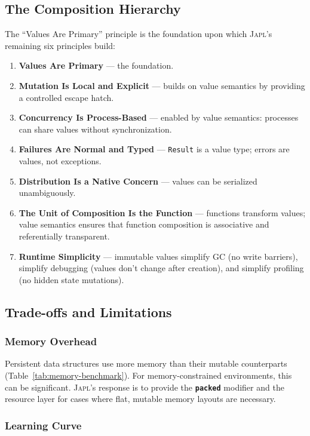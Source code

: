 \documentclass[11pt]{article}
\theoremstyle{definition}
\theoremstyle{remark}
\newcommand{\japl}{\textsc{Japl}}
\newcommand{\keyword}[1]{\texttt{\textbf{#1}}}
\begin{document}
\subsection{The Composition Hierarchy}

The ``Values Are Primary'' principle is the foundation upon which
\japl{}'s remaining six principles build:

\begin{enumerate}
  \item \textbf{Values Are Primary} --- the foundation.
  \item \textbf{Mutation Is Local and Explicit} --- builds on value
    semantics by providing a controlled escape hatch.
  \item \textbf{Concurrency Is Process-Based} --- enabled by value
    semantics: processes can share values without synchronization.
  \item \textbf{Failures Are Normal and Typed} --- \texttt{Result} is
    a value type; errors are values, not exceptions.
  \item \textbf{Distribution Is a Native Concern} --- values can be
    serialized unambiguously.
  \item \textbf{The Unit of Composition Is the Function} --- functions
    transform values; value semantics ensures that function
    composition is associative and referentially transparent.
  \item \textbf{Runtime Simplicity} --- immutable values simplify GC
    (no write barriers), simplify debugging (values don't change
    after creation), and simplify profiling (no hidden state mutations).
\end{enumerate}

\subsection{Trade-offs and Limitations}

\subsubsection{Memory Overhead}

Persistent data structures use more memory than their mutable
counterparts (Table~\ref{tab:memory-benchmark}).  For memory-constrained
environments, this can be significant.  \japl{}'s response is to
provide the \keyword{packed} modifier and the resource layer for cases
where flat, mutable memory layouts are necessary.

\subsubsection{Learning Curve}
\end{document}
